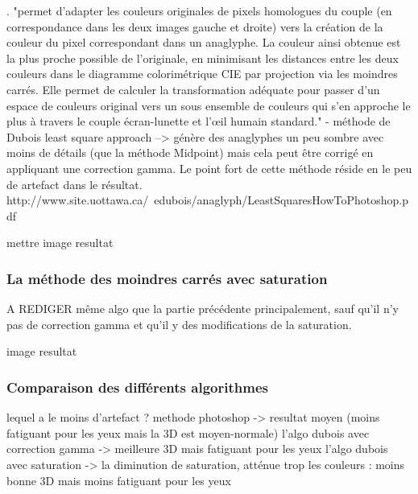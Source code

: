 	\cite{algoMoindreCarres}. 
	"permet d'adapter les couleurs originales de pixels homologues du couple (en correspondance dans les deux images gauche et droite) vers la création de la couleur du pixel correspondant dans un anaglyphe. La couleur ainsi obtenue est la plus proche possible de l'originale, en minimisant les distances entre les deux couleurs dans le diagramme colorimétrique CIE par projection via les moindres carrés. Elle permet de calculer la transformation adéquate pour passer d'un espace de couleurs original vers un sous ensemble de couleurs qui s'en approche le plus à travers le couple écran-lunette et l'œil humain standard."
- méthode de Dubois least square approach
--> génère des anaglyphes un peu sombre avec moins de détails (que la méthode Midpoint) mais cela peut être corrigé en appliquant une correction gamma. Le point fort de cette méthode réside en le peu de artefact dans le résultat.
http://www.site.uottawa.ca/~edubois/anaglyph/LeastSquaresHowToPhotoshop.pdf

mettre image resultat

\subsubsection{La méthode des moindres carrés avec saturation}
A REDIGER
même algo que la partie précédente principalement, sauf qu'il n'y pas de correction gamma et qu'il y des modifications de la saturation.

image resultat

\subsubsection{Comparaison des différents algorithmes}

lequel a le moins d'artefact ?
methode photoshop -> resultat moyen (moins fatiguant pour les yeux mais la 3D est moyen-normale)
l'algo dubois avec correction gamma -> meilleure 3D mais fatiguant pour les yeux
l'algo dubois avec saturation -> la diminution de saturation, atténue trop les couleurs : moins bonne 3D mais moins fatiguant pour les yeux 




